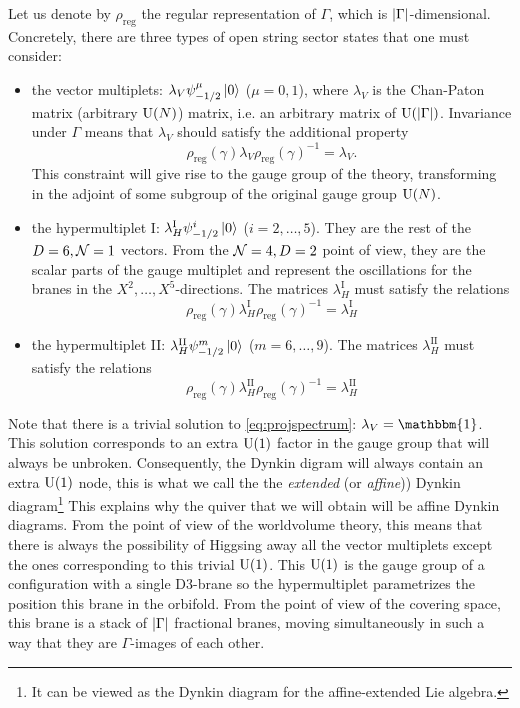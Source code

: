         Let us denote by $\rho_{\text{reg}}$ the regular representation of $\Gamma$, which is $\abs{\Gamma}$-dimensional. Concretely, there are three types of open string sector states that one must consider:
        \begin{itemize}
            \item the vector multiplets: $\lambda_V\psi^\mu_{-1/2}\ket{0}$ ($\mu=0,1$), where $\lambda_V$ is the Chan-Paton matrix (arbitrary $\text{U}(N)$) matrix, i.e. an arbitrary matrix of $\text{U}(\abs{\Gamma})$. Invariance under $\Gamma$ means that $\lambda_V$ should satisfy the additional property
            \begin{equation}
                \rho_{\text{reg}}(\gamma)\lambda_V\rho_{\text{reg}}(\gamma)^{-1}=\lambda_V.\label{eq:projspectrum}
            \end{equation}
            This constraint will give rise to the gauge group of the theory, transforming in the adjoint of some subgroup of the original gauge group $\text{U}(N)$.
            \item the hypermultiplet I: $\lambda^{\text{I}}_H\psi^i_{-1/2}\ket{0}$ ($i=2,\dots,5$). They are the rest of the $D=6,\mathcal{N}=1$ vectors. From the $\mathcal{N}=4,D=2$ point of view, they are the scalar parts of the gauge multiplet and represent the oscillations for the branes in the $X^2,\dots,X^5$-directions. The matrices $\lambda^{\text{I}}_H$ must satisfy the relations
            \begin{equation}
                \rho_{\text{reg}}(\gamma)\lambda^{\text{I}}_H\rho_{\text{reg}}(\gamma)^{-1}=\lambda^{\text{I}}_H
            \end{equation}
            \item the hypermultiplet II: $\lambda^{\text{II}}_H\psi^m_{-1/2}\ket{0}$ ($m=6,\dots,9$). The matrices $\lambda^{\text{II}}_H$ must satisfy the relations
            \begin{equation}
                \rho_{\text{reg}}(\gamma)\lambda^{\text{II}}_H\rho_{\text{reg}}(\gamma)^{-1}=\lambda^{\text{II}}_H
            \end{equation}
        \end{itemize}
        Note that there is a trivial solution to \eqref{eq:projspectrum}: $\lambda_V=\mathbbm{1}$. This solution corresponds to an extra $\text{U}(1)$ factor in the gauge group that will always be unbroken. Consequently, the Dynkin digram will always contain an extra $\text{U}(1)$ node, this is what we call the the \emph{extended} (or \emph{affine})) Dynkin diagram\footnote{It can be viewed as the Dynkin diagram for the affine-extended Lie algebra.} This explains why the quiver that we will obtain will be affine Dynkin diagrams. From the point of view of the worldvolume theory, this means that there is always the possibility of Higgsing away all the vector multiplets except the ones corresponding to this trivial $\text{U}(1)$. This $\text{U}(1)$ is the gauge group of a configuration with a single D$3$-brane so the hypermultiplet parametrizes the position this brane in the orbifold. From the point of view of the covering space, this brane is a stack of $\abs{\Gamma}$ fractional branes, moving simultaneously in such a way that they are $\Gamma$-images of each other.

